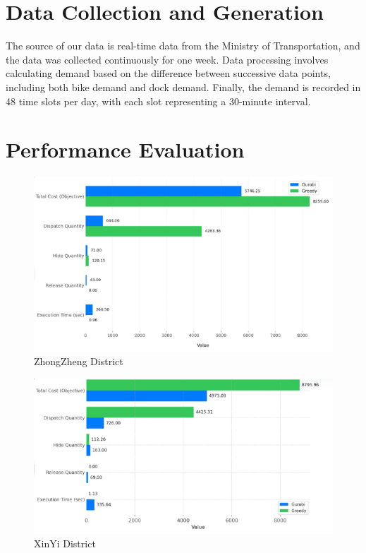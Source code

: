 \documentclass[11pt,a4paper]{article}
\begin{document}
\section{Data Collection and Generation}

The source of our data is real-time data from the Ministry of Transportation, and the data was collected continuously for one week.
Data processing involves calculating demand based on the difference between successive data points, including both bike demand and dock demand.
Finally, the demand is recorded in 48 time slots per day, with each slot representing a 30-minute interval.

\section{Performance Evaluation}

\begin{figure}[H]
\centering
\includegraphics[width=textwidth]{Zhongzheng.png}
\caption{ZhongZheng District}
\label{Figure 1}
\end{figure}

\begin{figure}[H]
\centering
\includegraphics[width=textwidth]{Xinyi.png}
\caption{XinYi District}
\label{Figure 2}
\end{figure}
\end{document}

